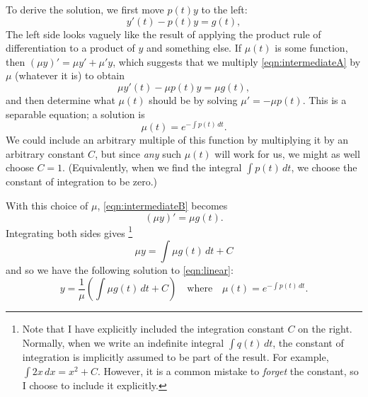 \documentclass[reqno]{immbook}
\numberwithin{equation}{chapter}
\numberwithin{question}{section}
\numberwithin{theorem}{chapter}
\numberwithin{figure}{chapter}
\theoremstyle{definition}
\begin{document}
To derive the solution, we first move $p(t)y$ to the left:
\begin{equation}
    y'(t) - p(t) y =  g(t),
\label{eqn:intermediateA}
\end{equation}
The left side looks vaguely like the result of applying the
product rule of differentiation to a product of $y$ and something else.
If $\mu(t)$ is some function, then $(\mu y)' = \mu y' + \mu' y$,
which suggests that we multiply \eqref{eqn:intermediateA}
by $\mu$ (whatever it is)
to obtain
\begin{equation}
    \mu y'(t) - \mu p(t) y =  \mu g(t),
\label{eqn:intermediateB}
\end{equation}
and then determine what $\mu(t)$ should
be by solving $\mu' = -\mu p(t)$.
This is a separable equation; a solution is
\begin{equation}
   \mu(t) = e^{-\int p(t)\, dt}.
\end{equation}
We could include an arbitrary multiple of this function
by multiplying it by an arbitrary constant $C$, but
since \emph{any} such $\mu(t)$ will work for us, we
might as well choose $C=1$.
(Equivalently, when we find the integral
$\int p(t)\,dt$, we choose the constant of integration
to be zero.)

With this choice of $\mu$, 
\eqref{eqn:intermediateB} becomes
\begin{equation}
    (\mu y)' =  \mu g(t).
\label{eqn:intermediateC}
\end{equation}
Integrating both sides gives%
\footnote{Note that I have explicitly included the integration
constant $C$ on the right.  Normally, when we write an indefinite
integral $\int q(t)\, dt$, the constant of integration is implicitly
assumed to be part of the result. For example, $\int 2x\,dx = x^2+C$.
However, it is a common mistake to \emph{forget} the constant, so
I choose to include it explicitly.}
\begin{equation}
    \mu y =  \int \mu g(t) \, dt + C
\label{eqn:intermediateD}
\end{equation}
and so we have the following solution
to \eqref{eqn:linear}:
\begin{equation}
    y =  \frac{1}{\mu}\left(\int \mu g(t) \, dt + C\right)
    \quad \textrm{where} \quad
    \mu(t) = e^{-\int p(t)\, dt}.
\label{eqn:linearsolution}
\end{equation}
\end{document}
